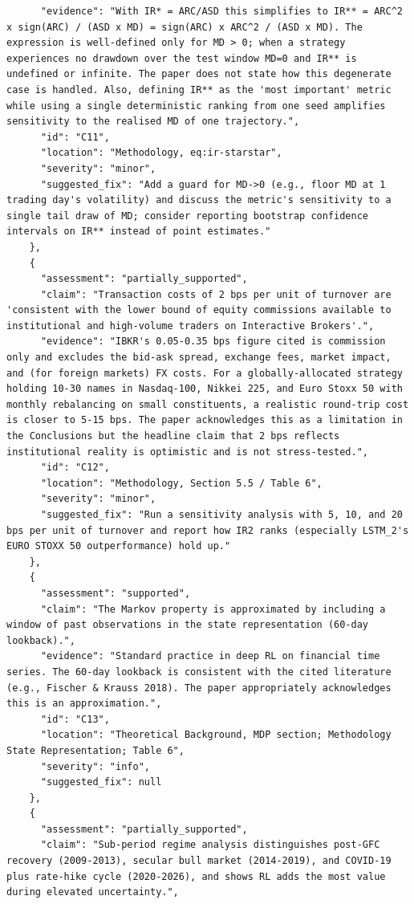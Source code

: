 \documentclass[11pt]{article}
\begin{document}
\begin{verbatim}
      "evidence": "With IR* = ARC/ASD this simplifies to IR** = ARC^2 x sign(ARC) / (ASD x MD) = sign(ARC) x ARC^2 / (ASD x MD). The expression is well-defined only for MD > 0; when a strategy experiences no drawdown over the test window MD=0 and IR** is undefined or infinite. The paper does not state how this degenerate case is handled. Also, defining IR** as the 'most important' metric while using a single deterministic ranking from one seed amplifies sensitivity to the realised MD of one trajectory.",
      "id": "C11",
      "location": "Methodology, eq:ir-starstar",
      "severity": "minor",
      "suggested_fix": "Add a guard for MD->0 (e.g., floor MD at 1 trading day's volatility) and discuss the metric's sensitivity to a single tail draw of MD; consider reporting bootstrap confidence intervals on IR** instead of point estimates."
    },
    {
      "assessment": "partially_supported",
      "claim": "Transaction costs of 2 bps per unit of turnover are 'consistent with the lower bound of equity commissions available to institutional and high-volume traders on Interactive Brokers'.",
      "evidence": "IBKR's 0.05-0.35 bps figure cited is commission only and excludes the bid-ask spread, exchange fees, market impact, and (for foreign markets) FX costs. For a globally-allocated strategy holding 10-30 names in Nasdaq-100, Nikkei 225, and Euro Stoxx 50 with monthly rebalancing on small constituents, a realistic round-trip cost is closer to 5-15 bps. The paper acknowledges this as a limitation in the Conclusions but the headline claim that 2 bps reflects institutional reality is optimistic and is not stress-tested.",
      "id": "C12",
      "location": "Methodology, Section 5.5 / Table 6",
      "severity": "minor",
      "suggested_fix": "Run a sensitivity analysis with 5, 10, and 20 bps per unit of turnover and report how IR2 ranks (especially LSTM_2's EURO STOXX 50 outperformance) hold up."
    },
    {
      "assessment": "supported",
      "claim": "The Markov property is approximated by including a window of past observations in the state representation (60-day lookback).",
      "evidence": "Standard practice in deep RL on financial time series. The 60-day lookback is consistent with the cited literature (e.g., Fischer & Krauss 2018). The paper appropriately acknowledges this is an approximation.",
      "id": "C13",
      "location": "Theoretical Background, MDP section; Methodology State Representation; Table 6",
      "severity": "info",
      "suggested_fix": null
    },
    {
      "assessment": "partially_supported",
      "claim": "Sub-period regime analysis distinguishes post-GFC recovery (2009-2013), secular bull market (2014-2019), and COVID-19 plus rate-hike cycle (2020-2026), and shows RL adds the most value during elevated uncertainty.",

\end{verbatim}
\end{document}
